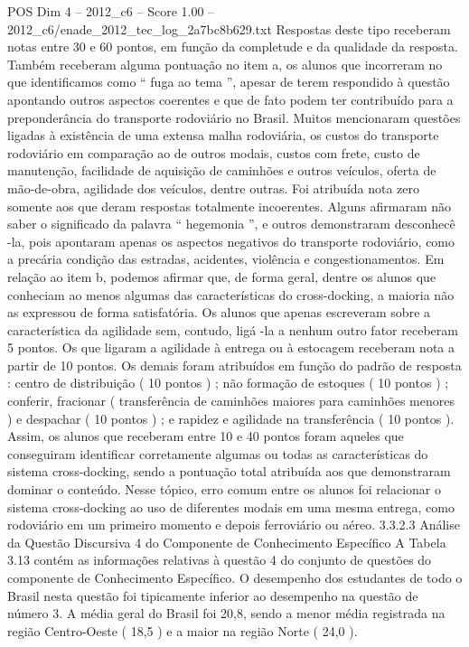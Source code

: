 \begin{textsample}{POS Dim 4 – 2012\_c6 – Score 1.00 – 2012\_c6/enade\_2012\_tec\_log\_2a7bc8b629.txt}
Respostas deste tipo receberam notas entre 30 e 60 pontos, em função da completude e da qualidade da resposta.
Também receberam alguma pontuação no item a, os alunos que incorreram no que identificamos como “ fuga ao tema ”, apesar de terem respondido à questão apontando outros aspectos coerentes e que de fato podem ter contribuído para a preponderância do transporte rodoviário no Brasil.
Muitos mencionaram questões ligadas à existência de uma extensa malha rodoviária, os custos do transporte rodoviário em comparação ao de outros modais, custos com frete, custo de manutenção, facilidade de aquisição de caminhões e outros veículos, oferta de mão-de-obra, agilidade dos veículos, dentre outras.
Foi atribuída nota zero somente aos que deram respostas totalmente incoerentes.
Alguns afirmaram não saber o significado da palavra “ hegemonia ”, e outros demonstraram desconhecê -la, pois apontaram apenas os aspectos negativos do transporte rodoviário, como a precária condição das estradas, acidentes, violência e congestionamentos.
Em relação ao item b, podemos afirmar que, de forma geral, dentre os alunos que conheciam ao menos algumas das características do cross-docking, a maioria não as expressou de forma satisfatória.
Os alunos que apenas escreveram sobre a característica da agilidade sem, contudo, ligá -la a nenhum outro fator receberam 5 pontos.
Os que ligaram a agilidade à entrega ou à estocagem receberam nota a partir de 10 pontos.
Os demais foram atribuídos em função do padrão de resposta : centro de distribuição ( 10 pontos ) ; não formação de estoques ( 10 pontos ) ; conferir, fracionar ( transferência de caminhões maiores para caminhões menores ) e despachar ( 10 pontos ) ; e rapidez e agilidade na transferência ( 10 pontos ).
Assim, os alunos que receberam entre 10 e 40 pontos foram aqueles que conseguiram identificar corretamente algumas ou todas as características do sistema cross-docking, sendo a pontuação total atribuída aos que demonstraram dominar o conteúdo.
Nesse tópico, erro comum entre os alunos foi relacionar o sistema cross-docking ao uso de diferentes modais em uma mesma entrega, como rodoviário em um primeiro momento e depois ferroviário ou aéreo. 3.3.2.3 Análise da Questão Discursiva 4 do Componente de Conhecimento Específico A Tabela 3.13 contém as informações relativas à questão 4 do conjunto de questões do componente de Conhecimento Específico.
O desempenho dos estudantes de todo o Brasil nesta questão foi tipicamente inferior ao desempenho na questão de número 3.
A média geral do Brasil foi 20,8, sendo a menor média registrada na região Centro-Oeste ( 18,5 ) e a maior na região Norte ( 24,0 ).

\end{textsample}
